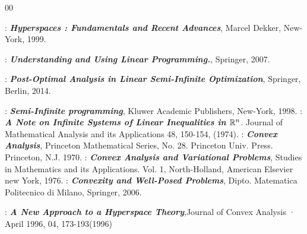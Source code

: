 \begin{thebibliography}{00}
	
	  : \textbf{\textit{Hyperspaces : Fundamentals and Recent Advances}}, Marcel Dekker, New-York, 1999.
	
		
	 : \textbf{\textit{Understanding and Using Linear Programming.}}, Springer, 2007.
	
	
	 : \textbf{\textit{Post-Optimal Analysis in Linear Semi-Infinite Optimization}}, Springer, Berlin, 2014.
	
	
	 : \textbf{\textit{Semi-Infinite programming}}, Kluwer Academic Publishers, New-York, 1998.
	 : \textbf{\textit{A Note on Infinite Systems of Linear Inequalities in $\mathbb{R}^n$}}. Journal of Mathematical Analysis and its Applications 48, 150-154, (1974).
	 : \textbf{\textit{Convex Analysis}}, Princeton Mathematical Series, No. 28. Princeton Univ. Press. Princeton, N.J. 1970.
	 : \textbf{\textit{Convex Analysis and Variational Problems}}, Studies in Mathematics and its Applications. Vol. 1, North-Holland, American Elsevier new York, 1976.
	 : \textbf{\textit{Convexity and Well-Posed Problems}}, Dipto. Matematica Politecnico di Milano, Springer, 2006.	

	 : \textbf{\textit{A New Approach to a Hyperspace Theory}},Journal of Convex Analysis · April 1996, 04, 173-193(1996)
\end{thebibliography}
\vspace{12pt}